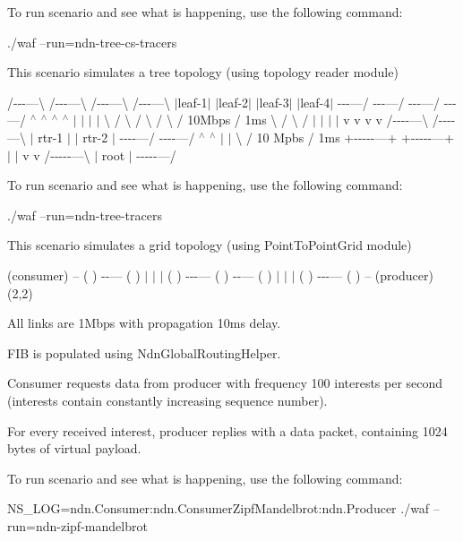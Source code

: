 To run scenario and see what is happening, use the following command\+: \begin{DoxyVerb}./waf --run=ndn-tree-cs-tracers\end{DoxyVerb}


This scenario simulates a tree topology (using topology reader module)

/-\/-\/-\/---\textbackslash{} /-\/-\/-\/---\textbackslash{} /-\/-\/-\/---\textbackslash{} /-\/-\/-\/---\textbackslash{} $\vert$leaf-\/1$\vert$ $\vert$leaf-\/2$\vert$ $\vert$leaf-\/3$\vert$ $\vert$leaf-\/4$\vert$ -\/-\/-\/---/ -\/-\/-\/---/ -\/-\/-\/---/ -\/-\/-\/---/ $^\wedge$ $^\wedge$ $^\wedge$ $^\wedge$ $\vert$ $\vert$ $\vert$ $\vert$ \textbackslash{} / \textbackslash{} / \textbackslash{} / \textbackslash{} / 10\+Mbps / 1ms \textbackslash{} / \textbackslash{} / $\vert$ $\vert$ $\vert$ $\vert$ v v v v /-\/-\/-\/-\/---\textbackslash{} /-\/-\/-\/-\/---\textbackslash{} $\vert$ rtr-\/1 $\vert$ $\vert$ rtr-\/2 $\vert$ -\/-\/-\/-\/---/ -\/-\/-\/-\/---/ $^\wedge$ $^\wedge$ $\vert$ $\vert$ \textbackslash{} / 10 Mpbs / 1ms +-\/-\/-\/-\/-\/---+ +-\/-\/-\/-\/-\/---+ $\vert$ $\vert$ v v /-\/-\/-\/-\/-\/---\textbackslash{} $\vert$ root $\vert$ -\/-\/-\/-\/-\/---/

To run scenario and see what is happening, use the following command\+: \begin{DoxyVerb}./waf --run=ndn-tree-tracers\end{DoxyVerb}


This scenario simulates a grid topology (using Point\+To\+Point\+Grid module)

(consumer) -- ( ) -\/-\/--- ( ) $\vert$ $\vert$ $\vert$ ( ) -\/-\/-\/--- ( ) -\/-\/--- ( ) $\vert$ $\vert$ $\vert$ ( ) -\/-\/-\/--- ( ) -- (producer)(2,2)

All links are 1\+Mbps with propagation 10ms delay.

F\+IB is populated using Ndn\+Global\+Routing\+Helper.

Consumer requests data from producer with frequency 100 interests per second (interests contain constantly increasing sequence number).

For every received interest, producer replies with a data packet, containing 1024 bytes of virtual payload.

To run scenario and see what is happening, use the following command\+: \begin{DoxyVerb}NS_LOG=ndn.Consumer:ndn.ConsumerZipfMandelbrot:ndn.Producer ./waf --run=ndn-zipf-mandelbrot\end{DoxyVerb}
 

